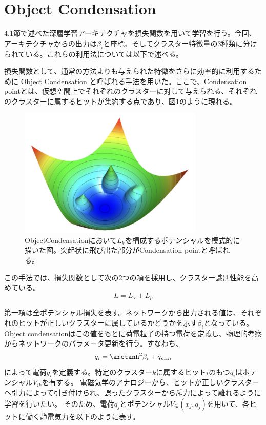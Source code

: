 \section{Object Condensation}
4.1節で述べた深層学習アーキテクチャを損失関数を用いて学習を行う。今回、アーキテクチャからの出力は$\beta_i$と座標、そしてクラスター特徴量の3種類に分けられている。これらの利用法については以下で述べる。

損失関数として、通常の方法よりも与えられた特徴をさらに効率的に利用するために Object Condensation と呼ばれる手法を用いた。ここで、Condensation pointとは、仮想空間上でそれぞれのクラスターに対して与えられる、それぞれのクラスターに属するヒットが集約する点であり、図\ref{ObjectCondensation}のように現れる。
\begin{figure}[H]
	\begin{center}
		\includegraphics[width=250pt]{./Figure/DLAnalysis/oc.png}
		\caption[ObjectCondensation]{ObjectCondensation\cite{StandardModel}において$L_V$を構成するポテンシャルを模式的に描いた図。突起状に飛び出た部分がCondensation pointと呼ばれる。}
		\label{ObjectCondensation}
	\end{center}
\end{figure}

この手法では、損失関数として次の2つの項を採用し、クラスター識別性能を高めている。
\begin{equation}
L=L_V + L_p
\end{equation}

第一項は全ポテンシャル損失を表す。ネットワークから出力される値は、それぞれのヒットが正しいクラスターに属しているかどうかを示す$\beta_i$となっている。Object condensationはこの値をもとに荷電粒子の持つ電荷を定義し、物理的考察からネットワークのパラメータ更新を行う。すなわち、
\begin{equation}
q_i =\arctanh^2\beta_i + q_{min}
\end{equation}
によって電荷$q_i$を定義する。特定のクラスター$k$に属するヒット$i$のもつ$q_i$はポテンシャル$V_{ik}$を有する。
電磁気学のアナロジーから、ヒットが正しいクラスターへ引力によって引き付けられ、誤ったクラスターから斥力によって離れるように学習を行いたい。
そのため、電荷$q_j$とポテンシャル$V_{ik}(x_j,q_j)$を用いて、各ヒットに働く静電気力を以下のように表す。

